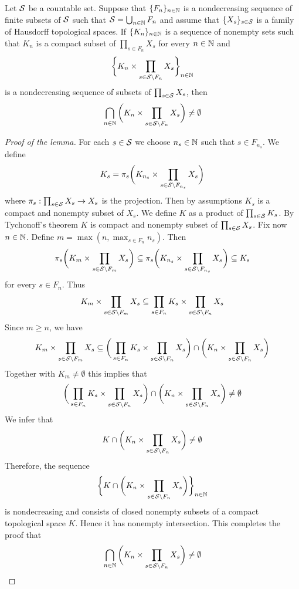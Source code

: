 \begin{lemma}\label{lemma:topological_part_kolmogorov_extension}
Let ${\mathcal S}$ be a countable set. Suppose that $\{F_n\}_{n\in {\mathbb N}}$ is a nondecreasing sequence of finite subsets of ${\mathcal S}$ such that ${\mathcal S} = \bigcup_{n\in {\mathbb N}}F_n$ and assume that $\{X_s\}_{s\in {\mathcal S}}$ is a family of Hausdorff topological spaces. If $\{K_n\}_{n\in {\mathbb N}}$ is a sequence of nonempty sets such that $K_n$ is a compact subset of $\prod_{s\in F_n}X_s$ for every $n\in {\mathbb N}$ and 
$$\bigg\{K_n\times \prod_{s\in {\mathcal S}\setminus F_n}X_s\bigg\}_{n\in {\mathbb N}}$$
is a nondecreasing sequence of subsets of $\prod_{s\in {\mathcal S}}X_s$, then
$$\bigcap_{n\in {\mathbb N}}\bigg(K_n\times \prod_{s\in {\mathcal S}\setminus F_n}X_s\bigg) \neq \emptyset$$
\end{lemma}
\begin{proof}[Proof of the lemma]
For each $s\in {\mathcal S}$ we choose $n_s\in {\mathbb N}$ such that $s \in F_{n_s}$. We define 
$$K_{s} = \pi_{s}\bigg(K_{n_s}\times \prod_{s\in {\mathcal S}\setminus F_{n_s}}X_s\bigg)$$
where $\pi_s:\prod_{s\in {\mathcal S}}X_s\rightarrow X_s$ is the projection. Then by assumptions $K_{s}$ is a compact and nonempty subset of $X_s$. We define $K$ as a product of $\prod_{s\in {\mathcal S}}K_s$. By Tychonoff's theorem $K$ is compact and nonempty subset of $\prod_{s\in {\mathcal S}}X_s$. Fix now $n\in {\mathbb N}$. Define $m = \max\left(n,\max_{s\in F_n}n_s\right)$. Then
$$\pi_s\bigg(K_{m}\times \prod_{s\in {\mathcal S}\setminus F_{m}}X_s\bigg) \subseteq \pi_s\bigg(K_{n_s}\times \prod_{s\in {\mathcal S}\setminus F_{n_s}}X_s\bigg)\subseteq K_s$$
for every $s\in F_n$. Thus
$$K_{m}\times \prod_{s\in {\mathcal S}\setminus F_{m}}X_s \subseteq \prod_{s\in F_n}K_s\times \prod_{s\in {\mathcal S}\setminus F_n}X_s$$
Since $m\geq n$, we have
$$K_{m}\times \prod_{s\in {\mathcal S}\setminus F_{m}}X_s \subseteq \bigg(\prod_{s\in F_n}K_s\times \prod_{s\in {\mathcal S}\setminus F_n}X_s\bigg)\cap \bigg(K_n\times \prod_{s\in {\mathcal S}\setminus F_n}X_s\bigg)$$
Together with $K_m\neq \emptyset$ this implies that
$$\bigg(\prod_{s\in F_n}K_s\times \prod_{s\in {\mathcal S}\setminus F_n}X_s\bigg)\cap \bigg(K_n\times \prod_{s\in {\mathcal S}\setminus F_n}X_s\bigg)\neq \emptyset$$
We infer that
$$K\cap \bigg(K_n\times \prod_{s\in {\mathcal S}\setminus F_n}X_s\bigg) \neq \emptyset$$
Therefore, the sequence 
$$\bigg\{K\cap \bigg(K_n\times \prod_{s\in {\mathcal S}\setminus F_n}X_s\bigg)\bigg\}_{n\in {\mathbb N}}$$
is nondecreasing and consists of closed nonempty subsets of a compact topological space $K$. Hence it has nonempty intersection. This completes the proof that
$$\bigcap_{n\in {\mathbb N}}\bigg(K_n\times \prod_{s\in {\mathcal S}\setminus F_n}X_s\bigg) \neq \emptyset$$
\end{proof}

